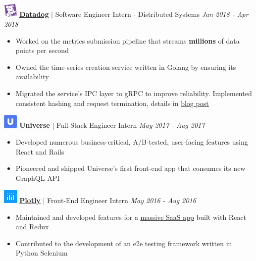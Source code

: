 \documentclass[paper=a4,fontsize=15pt]{scrartcl}
\newcommand{\fullspace}{\vspace*{1em}}
\begin{document}
\fullspace
\noindent \includegraphics[width=0.7cm, height=0.7cm]{assets/datadog.png}
\normalsize
\noindent \href{https://datadoghq.com}{\textbf{\ul{Datadog}}}
$\vert$ \small Software Engineer Intern - Distributed Systems
{\hfill \footnotesize \textit{Jan 2018 - Apr 2018}}
\begin{itemize}[noitemsep,leftmargin=20pt,label=\raisebox{0.25ex}{\tiny$\bullet$},topsep=5pt]
  \small
  \item Worked on the metrics submission pipeline that streams \textbf{millions} of data
    points per second
  \item Owned the time-series creation service written in Golang by ensuring its
    availability
  \item Migrated the service's IPC layer to gRPC to improve reliability.
    Implemented consistent hashing and request termination, details in
    \href{http://lpan.io/migrating-to-grpc}{\ul{blog post}}
\end{itemize}

\fullspace
\noindent \includegraphics[width=0.7cm, height=0.7cm]{assets/universe.png}
\normalsize
\noindent \href{https://universe.com}{\ul{\textbf{Universe}}}
$\vert$ \small Full-Stack Engineer Intern
{\hfill \footnotesize \textit{May 2017 - Aug 2017}}
\begin{itemize}[noitemsep,leftmargin=20pt,label=\raisebox{0.25ex}{\tiny$\bullet$},topsep=5pt]
  \small
  \item Developed numerous business-critical, A/B-tested, user-facing features
    using React and Rails
  \item Pioneered and shipped Universe's first front-end app that consumes its
    new GraphQL API
\end{itemize}

\fullspace
\noindent \includegraphics[width=0.7cm, height=0.7cm]{assets/plotly.png}
\normalsize
\noindent \href{https://plot.ly}{\textbf{\ul{Plotly}}}
$\vert$ \small Front-End Engineer Intern
{\hfill \footnotesize \textit{May 2016 - Aug 2016}}
\begin{itemize}[noitemsep,leftmargin=20pt,label=\raisebox{0.25ex}{\tiny$\bullet$},topsep=5pt]
  \small
  \item Maintained and developed features for a
    \href{https://plot.ly/online-chart-maker/}{\ul{massive SaaS app}} built with
    React and Redux
  \item Contributed to the development of an e2e testing framework written in
    Python Selenium
\end{itemize}
\end{document}
